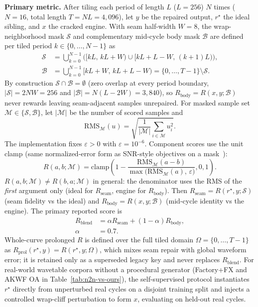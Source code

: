 \textbf{Primary metric.}
After tiling each period of length $L$ ($L{=}256$) $N$ times ($N{=}16$, total length $T{=}N L{=}4{,}096$), let $y$ be the repaired output, $r^{\star}$ the ideal sibling, and $x$ the cracked engine.
With seam half-width $W{=}8$, the wrap-neighborhood mask $\mathcal{S}$ and complementary mid-cycle body mask $\mathcal{B}$ are defined per tiled period $k\in\{0,\dots,N{-}1\}$ as
\begin{equation}
\label{eq:mask-SB}
\begin{aligned}
\mathcal{S} &= \bigcup_{k=0}^{N-1}\bigl([kL,\,kL{+}W)\cup[kL{+}L{-}W,\,(k{+}1)L)\bigr),\\
\mathcal{B} &= \bigcup_{k=0}^{N-1}[kL{+}W,\,kL{+}L{-}W) = \{0,\dots,T{-}1\}\setminus\mathcal{S}.
\end{aligned}
\end{equation}
By construction $\mathcal{S}\cap\mathcal{B}=\emptyset$ (zero overlap at every period boundary, $|\mathcal{S}|=2NW=256$ and $|\mathcal{B}|=N(L-2W)=3{,}840$), so $R_{\mathrm{body}}=R(x,y;\mathcal{B})$ never rewards leaving seam-adjacent samples unrepaired.
For masked sample set $\mathcal{M}\in\{\mathcal{S},\mathcal{B}\}$, let $|\mathcal{M}|$ be the number of scored samples and
\begin{equation}
\mathrm{RMS}_{\mathcal{M}}(u)=\sqrt{\frac{1}{|\mathcal{M}|}\sum_{i\in\mathcal{M}} u_i^2}.
\end{equation}
The implementation fixes $\varepsilon>0$ with $\varepsilon=10^{-6}$.
Component scores use the unit clamp (same normalized-error form as SNR-style objectives on a mask~\cite{purwins2019}):
\begin{equation}
\label{eq:R-component}
R(a,b;\mathcal{M})
=\mathrm{clamp}\!\left(
  1-\frac{\mathrm{RMS}_{\mathcal{M}}(a-b)}
         {\max\!\bigl(\mathrm{RMS}_{\mathcal{M}}(a),\,\varepsilon\bigr)},
  0,1\right).
\end{equation}
$R(a,b;\mathcal{M})\neq R(b,a;\mathcal{M})$ in general: the denominator uses the RMS of the \emph{first} argument only (ideal for $R_{\mathrm{seam}}$, engine for $R_{\mathrm{body}}$).
Then $R_{\mathrm{seam}}=R(r^{\star},y;\mathcal{S})$ (seam fidelity vs the ideal) and
$R_{\mathrm{body}}=R(x,y;\mathcal{B})$ (mid-cycle identity vs the engine).
The primary reported score is
\begin{equation}
\label{eq:R-blend}
\begin{aligned}
R_{\mathrm{blend}}
&=\alpha R_{\mathrm{seam}}+(1-\alpha)R_{\mathrm{body}},\\
\alpha&=0.7.
\end{aligned}
\end{equation}
Whole-curve prolonged $R$ is defined over the full tiled domain $\Omega{=}\{0,\dots,T{-}1\}$ as $R_{\mathrm{prol}}(r^{\star},y)=R(r^{\star},y;\Omega)$, which mixes seam repair with global waveform error; it is retained only as a superseded legacy key and never replaces $R_{\mathrm{blend}}$.
For real-world wavetable corpora without a procedural generator (Factory+FX and AKWF OA in Table~\ref{tab:n2n-vs-ours}), the self-supervised protocol instantiates $r^{\star}$ directly from unperturbed real cycles on a disjoint training split and injects a controlled wrap-cliff perturbation to form $x$, evaluating on held-out real cycles.

